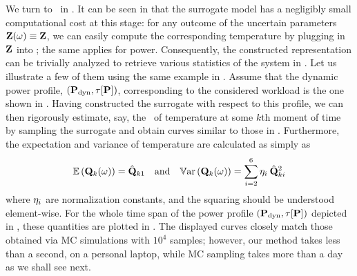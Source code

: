 

We turn to \ in .
It can be seen in  that the surrogate model has a negligibly small computational cost at this stage: for any outcome of the uncertain parameters $\mathbf{Z}(\omega) \equiv \mathbf{Z}$, we can easily compute the corresponding temperature by plugging in $\mathbf{Z}$ into ; the same applies for power.
Consequently, the constructed representation can be trivially analyzed to retrieve various statistics of the system in .
Let us illustrate a few of them using the same example in .
Assume that the dynamic power profile, $\profilePdyn$, corresponding to the considered workload is the one shown in .
Having constructed the surrogate with respect to this profile, we can then rigorously estimate, say, the \pdf\ of temperature at some $k$th moment of time by sampling the surrogate and obtain curves similar to those in .
Furthermore, the expectation and variance of temperature are calculated as simply as
\[
  \mathbb{E}\left(\mathbf{Q}_k(\omega)\right) = \hat{\mathbf{Q}}_{k1} \hspace{1em} \text{and} \hspace{1em} \mathbb{V}\text{ar}\left(\mathbf{Q}_k(\omega)\right) = \sum_{i = 2}^{6} \eta_i \: \hat{\mathbf{Q}}_{ki}^2
\]
where $\eta_i$ are normalization constants, and the squaring should be understood element-wise.
For the whole time span of the power profile $\profilePdyn$ depicted in , these quantities are plotted in .
The displayed curves closely match those obtained via MC simulations with $10^4$ samples; however, our method takes less than a second, on a personal laptop, while MC sampling takes more than a day as we shall see next.

